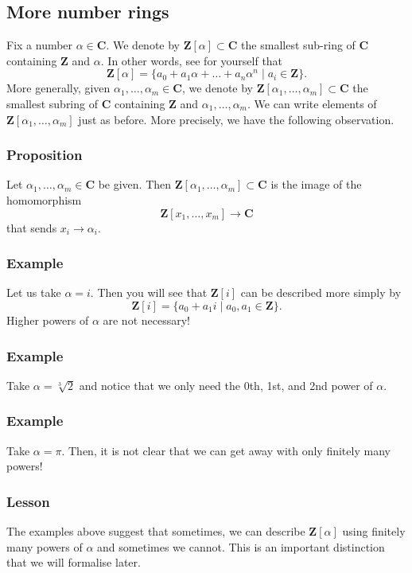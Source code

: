 \documentclass[11pt]{article}
\begin{document}
\subsection{More number rings}
\label{sec:org71d21fc}
Fix a number \(\alpha \in \mathbf{C}\).
We denote by \(\mathbf{Z}[\alpha] \subset \mathbf{C}\) the smallest sub-ring of \(\mathbf{C}\) containing \(\mathbf{Z}\) and \(\alpha\).
In other words, see for yourself that
\[ \mathbf{Z}[\alpha] = \{a_{0} + a_1 \alpha + \dots + a_{n}\alpha^{n} \mid a_i \in \mathbf{Z}\}.\]
More generally, given \(\alpha_{1}, \dots, \alpha_{m} \in \mathbf{C}\), we denote by \(\mathbf{Z}[\alpha_{1}, \dots, \alpha_{m}] \subset \mathbf{C}\) the smallest subring of \(\mathbf{C}\) containing \(\mathbf{Z}\) and \(\alpha_1, \dots, \alpha_{m}\).
We can write elements of \(\mathbf{Z}[\alpha_{1},\dots, \alpha_{m}]\) just as before.
More precisely, we have the following observation.
\subsubsection{Proposition}
\label{sec:org605c368}
Let \(\alpha_{1}, \dots, \alpha_{m} \in \mathbf{C}\) be given.
Then \(\mathbf{Z}[\alpha_{1}, \dots, \alpha_{m}] \subset \mathbf{C}\)  is the image of the homomorphism
\[ \mathbf{Z}[x_1, \dots, x_m] \to \mathbf{C}\]
that sends \(x_i \to \alpha_{i}\).
\subsubsection{Example}
\label{sec:org328295d}
Let us take \(\alpha = i\).
Then you will see that \(\mathbf{Z}[i]\) can be described more simply by
\[ \mathbf{Z}[i] = \{a_{0} + a_{1} i \mid a_{0}, a_{1} \in \mathbf{Z}\}.\]
Higher powers of \(\alpha\) are not necessary!
\subsubsection{Example}
\label{sec:orga5ab8d0}
Take \(\alpha = \sqrt[3]{2}\) and notice that we only need the 0th, 1st, and 2nd power of \(\alpha\).
\subsubsection{Example}
\label{sec:orgb733147}
Take \(\alpha = \pi\).
Then, it is not clear that we can get away with only finitely many powers!
\subsubsection{Lesson}
\label{sec:orgd28d290}
The examples above suggest that sometimes, we can describe \(\mathbf{Z}[\alpha]\) using finitely many powers of \(\alpha\) and sometimes we cannot.
This is an important distinction that we will formalise later.
\end{document}
